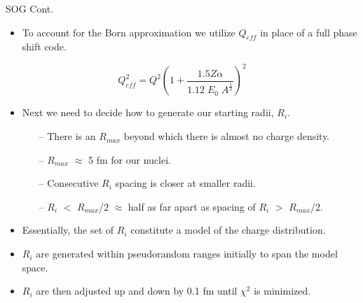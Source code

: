 \documentclass[10pt]{beamer}
\begin{document}
\begin{frame}[fragile]{SOG Cont.}

	\begin{itemize}
		\item To account for the Born approximation we utilize \alert{$Q_{eff}$} in place of a full phase shift code. 
	\end{itemize}
	
	\vspace{-3mm}
	\begin{equation} \label{eq:qeff}
		Q^2_{eff} = Q^2 \left(  1+ \frac{1.5Z\alpha}{1.12 \; E_0 \; A^{\frac{1}{3}}}   \right)^2
	\end{equation}
	
	\pause
	\begin{itemize}
		\item Next we need to decide how to generate our \alert{starting radii}, $R_i$.
		\begin{itemize}
			\pause
			\item[--] There is an \alert{$R_{max}$} beyond which there is almost no charge density.
			\item[--] $R_{max}$ $\approx$ 5 fm for our nuclei.
			\item[--] Consecutive $R_i$ \alert{spacing is closer at smaller radii}.
			\item[--] $R_i$ $<$ $R_{max}$/2 $\approx$ half as far apart as spacing of $R_i$ $>$ $R_{max}$/2.
		\end{itemize}
		\pause
		\item Essentially, the \alert{set of $R_i$ constitute a model} of the charge distribution.
		\item $R_i$ are generated within pseudorandom ranges initially to span the model space.
		\item $R_i$ are then adjusted up and down by 0.1 fm until $\chi^2$ is minimized.
	\end{itemize}

\end{frame}
\end{document}
